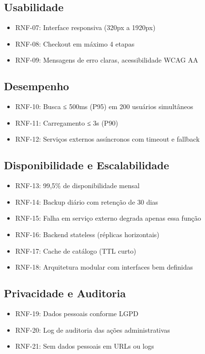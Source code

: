 \documentclass[12pt,a4paper]{article}
\providecommand{\tightlist}{%
  \setlength{\itemsep}{0pt}\setlength{\parskip}{0pt}}
\begin{document}
\subsection{Usabilidade}

\begin{itemize}
\tightlist
\item RNF-07: Interface responsiva (320px a 1920px)
\item RNF-08: Checkout em máximo 4 etapas
\item RNF-09: Mensagens de erro claras, acessibilidade WCAG AA
\end{itemize}

\subsection{Desempenho}

\begin{itemize}
\tightlist
\item RNF-10: Busca ≤ 500ms (P95) em 200 usuários simultâneos
\item RNF-11: Carregamento ≤ 3s (P90)
\item RNF-12: Serviços externos assíncronos com timeout e fallback
\end{itemize}

\subsection{Disponibilidade e Escalabilidade}

\begin{itemize}
\tightlist
\item RNF-13: 99,5\% de disponibilidade mensal
\item RNF-14: Backup diário com retenção de 30 dias
\item RNF-15: Falha em serviço externo degrada apenas essa função
\item RNF-16: Backend stateless (réplicas horizontais)
\item RNF-17: Cache de catálogo (TTL curto)
\item RNF-18: Arquitetura modular com interfaces bem definidas
\end{itemize}

\subsection{Privacidade e Auditoria}

\begin{itemize}
\tightlist
\item RNF-19: Dados pessoais conforme LGPD
\item RNF-20: Log de auditoria das ações administrativas
\item RNF-21: Sem dados pessoais em URLs ou logs
\end{itemize}
\end{document}
